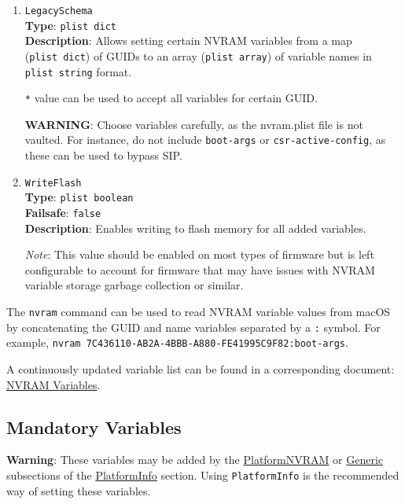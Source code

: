 \documentclass[]{article}
\makeatletter
\renewcommand{\label}[1]{%
\zref@wrapper@immediate{\oldlabel{#1}}}  %
\makeatother
\begin{document}
\begin{enumerate}
  \emph{Note}: Only variables accessible from the operating system will be overwritten.

\item
  \texttt{LegacySchema}\\
  \textbf{Type}: \texttt{plist\ dict}\\
  \textbf{Description}: Allows setting certain NVRAM variables from a map
  (\texttt{plist\ dict}) of GUIDs to an array (\texttt{plist\ array}) of
  variable names in \texttt{plist\ string} format.

  \texttt{*} value can be used to accept all variables for certain GUID.

  \textbf{WARNING}: Choose variables carefully, as the nvram.plist file is not vaulted.
  For instance, do not include \texttt{boot-args} or \texttt{csr-active-config}, as
  these can be used to bypass SIP.

\item
  \texttt{WriteFlash}\\
  \textbf{Type}: \texttt{plist\ boolean}\\
  \textbf{Failsafe}: \texttt{false}\\
  \textbf{Description}: Enables writing to flash memory for all added variables.

  \emph{Note}: This value should be enabled on most types of firmware but is
  left configurable to account for firmware that may have issues with NVRAM
  variable storage garbage collection or similar.

\end{enumerate}

The \texttt{nvram} command can be used to read NVRAM variable values from macOS
by concatenating the GUID and name variables separated by a \texttt{:} symbol.
For example, \texttt{nvram 7C436110-AB2A-4BBB-A880-FE41995C9F82:boot-args}.

A continuously updated variable list can be found in a corresponding document:
\href{https://docs.google.com/spreadsheets/d/1HTCBwfOBkXsHiK7os3b2CUc6k68axdJYdGl-TyXqLu0}{NVRAM Variables}.

\subsection{Mandatory Variables}\label{nvramvars}

\textbf{Warning}: These variables may be added by the
\hyperref[platforminfonvram]{PlatformNVRAM} or
\hyperref[platforminfogeneric]{Generic} subsections of the
\hyperref[platforminfo]{PlatformInfo} section.
Using \texttt{PlatformInfo} is the recommended way of setting these variables.
\end{document}
